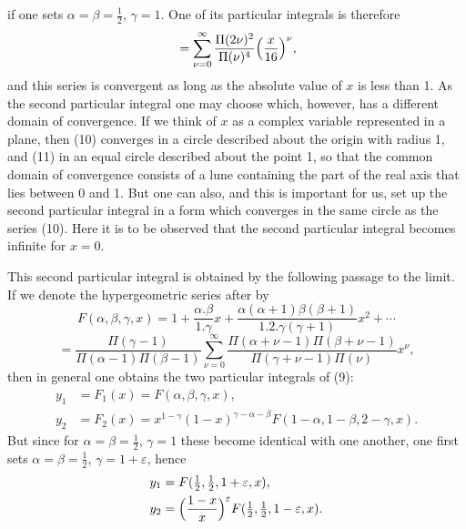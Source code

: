 
if one sets $\alpha=\beta=\frac12$, $\gamma=1$. One of its
particular integrals is therefore
\[
{}= \sum_{\nu=0}^{\infty} \frac{\Pi(2\nu)^2}{\Pi(\nu)^4}\Bigl(\frac{x}{16}\Bigr)^\nu,
\]
and this series is convergent as long as the absolute value of
$x$ is less than 1. As the second particular integral one may
choose
which, however, has a different domain of convergence. If we think of
$x$ as a complex variable represented in a plane, then (10) converges
in a circle described about the origin with radius 1, and (11) in an
equal circle described about the point 1, so that the common domain of
convergence consists of a lune containing the part of the real
axis that lies between 0 and 1. But one can also, and this is important
for us, set up the second particular integral in a form which converges
in the same circle as the series (10). Here it is to be observed
that the second particular integral becomes infinite for $x=0$.

This second particular integral is obtained by the
following passage to the limit. If we denote the hypergeometric
series after  by
\[
F(\alpha,\beta,\gamma,x) = 1 + \frac{\alpha.\beta}{1.\gamma}x + \frac{\alpha(\alpha+1)\beta(\beta+1)}{1.2.\gamma(\gamma+1)}x^2 + \cdots
\]
\[
{}= \frac{\Pi(\gamma-1)}{\Pi(\alpha-1)\Pi(\beta-1)} \sum_{\nu=0}^{\infty} \frac{\Pi(\alpha+\nu-1)\Pi(\beta+\nu-1)}{\Pi(\gamma+\nu-1)\Pi(\nu)} x^\nu,
\]
then in general one obtains the two particular integrals
of (9):
\[
\begin{aligned}
y_1 &= F_1(x) = F(\alpha,\beta,\gamma,x), \\
y_2 &= F_2(x) = x^{1-\gamma}(1-x)^{\gamma-\alpha-\beta} F(1-\alpha,1-\beta,2-\gamma,x).
\end{aligned}
\]
But since for $\alpha=\beta=\frac12$, $\gamma=1$ these become identical
with one another, one first sets $\alpha=\beta=\frac12$, $\gamma=1+\varepsilon$, hence
\[
\begin{aligned}
y_1 &= F(\tfrac12,\tfrac12,1+\varepsilon,x), \\
y_2 &= \Bigl(\frac{1-x}{x}\Bigr)^\varepsilon F(\tfrac12,\tfrac12,1-\varepsilon,x).
\end{aligned}
\]
